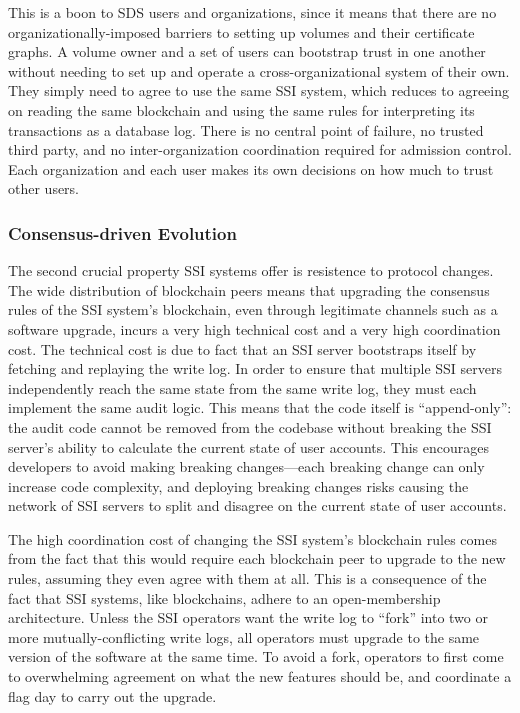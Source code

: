 This is a boon to SDS users and organizations, since it means
that there are no organizationally-imposed barriers to setting up volumes and
their certificate graphs.  A volume owner and a set of users can bootstrap trust
in one another without needing to set up and operate a cross-organizational
system of their own.  They simply need to agree to use the same SSI system,
which reduces to agreeing on reading the same blockchain and using the same rules for
interpreting its transactions as a database log.  There is no central point of
failure, no trusted third party, and no inter-organization coordination required
for admission control.  Each organization and each user makes its own decisions
on how much to trust other users.

\subsubsection{Consensus-driven Evolution}

The second crucial property SSI systems offer is resistence to protocol changes.
The wide distribution of blockchain peers means that upgrading
the consensus rules of the SSI system's blockchain, even through legitimate channels such as a 
software upgrade, incurs a very high technical cost and a very high coordination cost.
The technical cost is due to fact that an SSI server
bootstraps itself by fetching and replaying the write log.  In order to
ensure that multiple SSI servers independently reach the same state from the
same write log, they must each implement the same audit logic.  This means that
the code itself is ``append-only'':  the audit code cannot be removed from
the codebase without breaking the SSI server's ability to calculate the current
state of user accounts.  This encourages developers to avoid making breaking
changes---each breaking change can only increase code complexity,
and deploying breaking changes risks causing the network of SSI servers to split
and disagree on the current state of user accounts.

The high coordination cost of changing the SSI system's blockchain rules
comes from the fact that this would require each blockchain peer to upgrade
to the new rules, assuming they even agree with them at all.  This is a
consequence of the fact that SSI systems, like blockchains, adhere to an
open-membership architecture.  Unless the SSI
operators want the write log to ``fork'' into two or more mutually-conflicting
write logs, all operators must upgrade to the same version of the software
at the same time.  To avoid a fork, operators to first come to overwhelming
agreement on what the new features should be, and coordinate a flag day
to carry out the upgrade.


